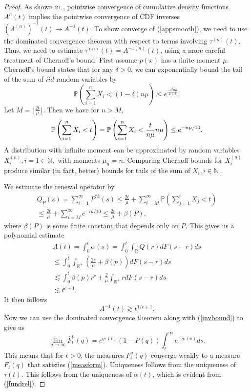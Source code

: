 \begin{proof}
  As shown in \cite{menon2010dynamics}, pointwise convergence  of cumulative density functions
$A^n(t)$ implies the pointwise convergence of CDF inverses $(A^{(n)})^{-1}(t) \rightarrow A^{-1}(t)$. To show converge of (\ref{appsmooth}), we need to use the dominated convergence theorem with respect to terms involving $\tau^{(n)}(t)$. Thus, we need to estimate $\tau^{(n)}(t) = A^{-1(n)}(t)$, using a more careful treatment of Chernoff's bound.  First assume $p(x)$ has a finite moment $\mu$.  Chernoff's bound \cite{chernoff1952measure} states that for any $\delta>0$, we can exponentially bound the tail of the sum of $iid$ random variables by
\begin{equation}
\mathbb{P}\left(\sum_{i= 1}^nX_i<(1-\delta)n\mu\right) \le e^{\frac{-\delta^2 n \mu}{2+\delta}}.
\end{equation}
Let $M=\lfloor \frac{2t}\mu\rfloor$. Then we have
for $n>M$, 
\begin{equation} \mathbb{P}\left(\sum_{i = 1}^n X_i<t\right) = \mathbb{P}\left(\sum_{i = 1}^n X_i<\frac t{n\mu} n\mu\right) \le e^{-n\mu/10}.\\ 
\end{equation}
A distribution with infinite moment can be approximated by random variables $X_i^{(n)}, i = 1\in \mathbb N,$ with moments $\mu_n = n$.  Comparing Chernoff bounds for $X_i^{(n)}$ produce similar (in fact, better) bounds for tails of the sum of $X_i, i \in \mathbb N$ .

We estimate the renewal operator by
\begin{eqnarray} Q_{P}(s) = \sum_{i = 1}^\infty P^{*k}(s) \le \frac {2t}\mu +\sum_{i= M}^\infty \mathbb{P}\left(\sum_{j = 1}^i X_j<t\right) \\
\le \frac {2t}\mu +\sum_{i = M}^\infty  e^{-i\mu/10}\le \frac {2t}{\mu} +\beta(P) \nonumber, 
\end{eqnarray}
where $\beta(P)$ is some finite constant that depends only on  $P$.  This gives us a polynomial estimate  
\begin{eqnarray}
A(t) = \int_0^t \alpha(s) = \int_0^t \int_\mathbb{R}  Q(r)dF(s-r) ds \\
\le \int_0^t \int_{\mathbb{R}^+}(\frac {2r}\mu+\beta(p))dF(s-r)ds \nonumber\\
\lesssim \int_0^t \beta(p)r^{c}+ \frac 2\mu \int_{\mathbb R^+}rdF(s-r) ds \nonumber\\
\lesssim t^{c+1} \nonumber.
\end{eqnarray}
It then follows 
\begin{equation} \label{invbound}
A^{-1}(t) \gtrsim t^{1/{c+1}}.
 \end{equation}
  Now we can use the dominated convergence theorem along with (\ref{invbound}) to give us 
\begin{equation}
\lim_{n\rightarrow \infty}\bar F_t^n(q) = e^{q\tau^{}(t)}(1-P(q))\int_t^\infty e^{-q\tau(s)}ds .
\end{equation}
This means that for $t>0$, the measures $F_t^n(q)$ converge weakly to a measure $F_t(q)$ that satisfies (\ref{measform}). Uniqueness follows from the uniqueness of  $\tau(t)$. This follows from the uniqueness of $\alpha(t)$, which is evident from (\ref{fundrel}).  




\end{proof}
